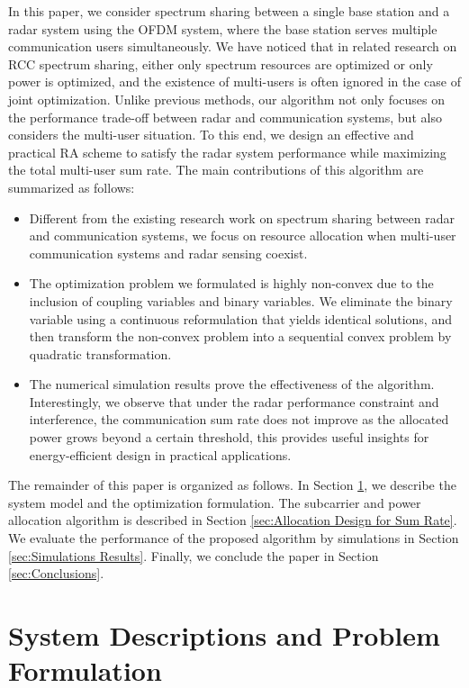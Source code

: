\documentclass[a4paper,journal,10pt]{IEEEtran}
\begin{document}
In this paper, we consider spectrum sharing between a single base station and a radar system using the OFDM system, where the base station serves multiple communication users simultaneously.
We have noticed that in related research on RCC spectrum sharing, either only spectrum resources are optimized or only power is optimized, and the existence of multi-users is often ignored in the case of joint optimization.
Unlike previous methods, our algorithm not only focuses on the performance trade-off between radar and communication systems, but also considers the multi-user situation. To this end, we design an effective and practical RA scheme to satisfy the radar system performance while maximizing the total multi-user sum rate. The main contributions of this algorithm are summarized as follows:
\begin{itemize}
	\item Different from the existing research work on spectrum sharing between radar and communication systems, we focus on resource allocation when multi-user communication systems and radar sensing coexist.
	\item The optimization problem we formulated is highly non-convex due to the inclusion of coupling variables and binary variables. We eliminate the binary variable using a continuous reformulation that yields identical solutions, and then transform the non-convex problem into a sequential convex problem by quadratic transformation.
	\item The numerical simulation results prove the effectiveness of the algorithm. Interestingly, we observe that under the radar performance constraint and interference, the communication sum rate does not improve as the allocated power grows beyond a certain threshold, this provides useful insights for energy-efficient design in practical applications.
\end{itemize}

The remainder of this paper is organized as follows. In Section \ref{Sec:System Descriptions}, we describe the system model and the optimization formulation. The subcarrier and power allocation algorithm is described in Section \ref{sec:Allocation Design for Sum Rate}. We evaluate the performance of the proposed algorithm by simulations in Section \ref{sec:Simulations Results}. Finally, we conclude the paper in Section \ref{sec:Conclusions}.



\section{System Descriptions and Problem Formulation}\label{Sec:System Descriptions}
\end{document}
